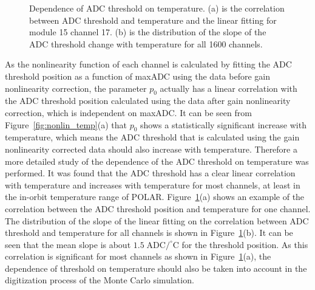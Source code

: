 \documentclass[preprint,sort&compress,12pt]{elsarticle}
\begin{document}
\begin{figure}[!ht]
\centering
{}
\hspace{2mm}
\caption{Dependence of ADC threshold on temperature. (a) is the correlation between ADC threshold and temperature and the linear fitting for module 15 channel 17. (b) is the distribution of the slope of the ADC threshold change with temperature for all 1600 channels.}\label{fig:vthr_temp}
\end{figure}

As the nonlinearity function of each channel is calculated by fitting the ADC threshold position as a function of maxADC using the data before gain nonlinearity correction, the parameter $p_0$ actually has a linear correlation with the ADC threshold position calculated using the data after gain nonlinearity correction, which is independent on maxADC. It can be seen from Figure~\ref{fig:nonlin_temp}(a) that $p_0$ shows a statistically significant increase with temperature, which means the ADC threshold that is calculated using the gain nonlinearity corrected data should also increase with temperature. Therefore a more detailed study of the dependence of the ADC threshold on temperature was performed. It was found that the ADC threshold has a clear linear correlation with temperature and increases with temperature for most channels, at least in the in-orbit temperature range of POLAR. Figure~\ref{fig:vthr_temp}(a) shows an example of the correlation between the ADC threshold position and temperature for one channel. The distribution of the slope of the linear fitting on the correlation between ADC threshold and temperature for all channels is shown in Figure~\ref{fig:vthr_temp}(b). It can be seen that the mean slope is about $1.5\;\mathrm{ADC}/^\circ\mathrm{C}$ for the threshold position. As this correlation is significant for most channels as shown in Figure~\ref{fig:vthr_temp}(a), the dependence of threshold on temperature should also be taken into account in the digitization process of the Monte Carlo simulation.
\end{document}

